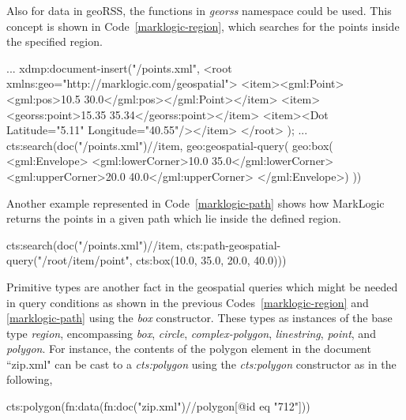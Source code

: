 \documentclass[a4paper,12pt]{article}
\begin{document}
Also for data in geoRSS, the functions in \textit{georss} namespace could be used. 
This concept is shown in Code~\ref{marklogic-region}, which searches for the points inside the specified region. 
\vspace{10px}
\begin{fakeXML}[escapechar=\%,label=marklogic-region,caption=A query example in MarkLogic]
...
xdmp:document-insert("/points.xml",
<root xmlns:geo="http://marklogic.com/geospatial">
  <item><gml:Point><gml:pos>10.5 30.0</gml:pos></gml:Point></item>
  <item><georss:point>15.35 35.34</georss:point></item>
  <item><Dot Latitude="5.11" Longitude="40.55"/></item>
</root> );
 ...
cts:search(doc("/points.xml")//item, 
 geo:geospatial-query(
   geo:box(
     <gml:Envelope>
       <gml:lowerCorner>10.0 35.0</gml:lowerCorner>
       <gml:upperCorner>20.0 40.0</gml:upperCorner>
     </gml:Envelope>)
 ))
 
 \end{fakeXML}
\vspace{10px}
Another example represented in Code~\ref{marklogic-path} shows how MarkLogic returns the 
points in a given path which lie inside the defined region.
\vspace{10px}
\begin{fakeXML}[escapechar=\%,label=marklogic-path,caption=Another query example in MarkLogic]
cts:search(doc("/points.xml")//item,
  cts:path-geospatial-query("/root/item/point", 
  			cts:box(10.0, 35.0, 20.0, 40.0)))
\end{fakeXML}
\vspace{10px}

Primitive types are another fact in the geospatial queries which might be needed in query conditions 
as shown in the previous Codes~\ref{marklogic-region} and \ref{marklogic-path} using the \textit{box} constructor. These types as instances of the base type \textit{region}, encompassing \textit{box}, \textit{circle}, \textit{complex-polygon}, \textit{linestring}, \textit{point}, and \textit{polygon}. For instance, the contents of the polygon element in the document ``zip.xml" can be cast to a \textit{cts:polygon} using the \textit{cts:polygon} constructor as in the following,
\vspace{10px}
\begin{fakeJSON}
cts:polygon(fn:data(fn:doc("zip.xml")//polygon[@id eq "712"]))
\end{fakeJSON}
\vspace{10px}
\end{document}

